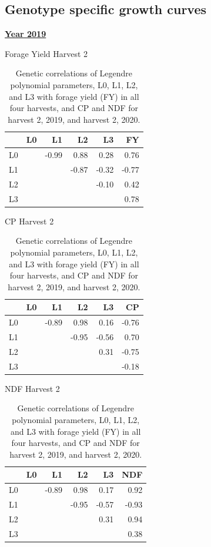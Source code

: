 \documentclass[12pt, letterpaper]{article}
\begin{document}
\subsection{Genotype specific growth curves}

\begin{table}[h]
\caption{Genetic correlations of Legendre polynomial parameters, L0, L1, L2, and L3 with forage yield (FY) in all four harvests, and CP and NDF for harvest 2, 2019, and harvest 2, 2020. }
\noindent%
\begin{minipage}[h]{.45\textwidth}
\centering

\textbf{\underline{Year 2019}}

\medskip

Forage Yield Harvest 2

\medskip

\begin{tabular}{rrrrrr}
 & L0 & L1 & L2 & L3 & FY \\ 
  \hline
  L0 &  & -0.99 & 0.88 & 0.28 & 0.76 \\ 
  L1 & &  & -0.87 & -0.32 & -0.77 \\ 
  L2 & & &  & -0.10 & 0.42 \\ 
  L3 & & & &  & 0.78 \\ 
   \hline
\end{tabular}

\bigskip
\bigskip

CP Harvest 2

\medskip

\begin{tabular}{rrrrrr}
 & L0 & L1 & L2 & L3 & CP \\ 
  \hline
  L0 &  & -0.89 & 0.98 & 0.16 & -0.76 \\ 
  L1 & & & -0.95 & -0.56 & 0.70 \\ 
  L2 & & & & 0.31 & -0.75 \\ 
  L3 & & & & & -0.18 \\ 
   \hline
\end{tabular}
\bigskip
\bigskip

NDF Harvest 2

\medskip

\begin{tabular}{rrrrrr}
 & L0 & L1 & L2 & L3 & NDF \\ 
  \hline
  L0 & & -0.89 & 0.98 & 0.17 & 0.92 \\ 
  L1 & & & -0.95 & -0.57 & -0.93 \\ 
  L2 & & & & 0.31 & 0.94 \\ 
  L3 & & & & & 0.38 \\ 
   \hline
\end{tabular}


\end{minipage}
\end{table}
\end{document}
